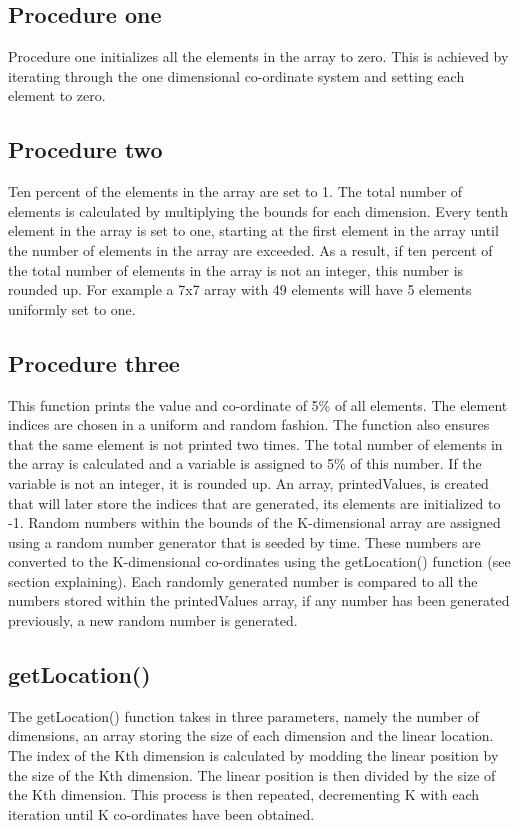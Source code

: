 \documentclass[10pt,onecolumn]{article}
\begin{document}
\subsection*{Procedure one}
Procedure one initializes all the elements in the array to zero. This is achieved by iterating through the one dimensional co-ordinate system and setting each element to zero. 

\subsection*{Procedure two}
Ten percent of the elements in the array are set to 1. The total number of elements is calculated by multiplying the bounds for each dimension. Every tenth element in the array is set to one, starting at the first element in the array until the number of elements in the array are exceeded. As a result, if ten percent of the total number of elements in the array is not an integer, this number is rounded up. For example a 7x7 array with 49 elements will have 5 elements uniformly set to one.

\subsection*{Procedure three}
This function prints the value and co-ordinate of 5\% of all elements. The element indices are chosen in a uniform and random fashion. The function also ensures that the same element is not printed two times. The total number of elements in the array is calculated and a variable is assigned to 5\% of this number. If the variable is not an integer, it is rounded up. An array, printedValues, is created that will later store the indices that are generated, its elements are initialized to -1. Random numbers within the bounds of the K-dimensional array are assigned using a random number generator that is seeded by time. These numbers are converted to the K-dimensional co-ordinates using the getLocation() function (see section explaining). Each randomly generated number is compared to all the numbers stored within the printedValues array, if any number has been generated previously, a new random number is generated. \\

\subsection*{getLocation()}
The getLocation() function takes in three parameters, namely the number of dimensions, an array storing the size of each dimension and the linear location. The index of the Kth dimension is calculated by modding the linear position by the size of the Kth dimension. The linear position is then divided by the size of the Kth dimension. This process is then repeated, decrementing K with each iteration until K co-ordinates have been obtained. \\
\end{document}
